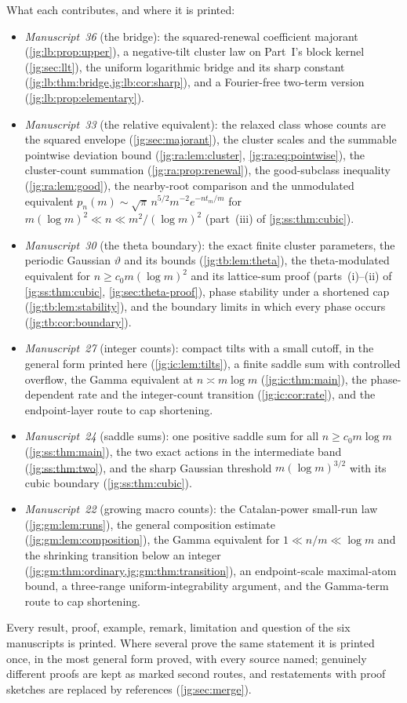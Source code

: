 \documentclass[11pt,a4paper]{article}
\theoremstyle{definition}\newaliascnt{definition}{theorem}
\theoremstyle{remark}\newaliascnt{remark}{theorem}
\begin{document}
What each contributes, and where it is printed:
\begin{itemize}
\item \emph{Manuscript~36} (the bridge): the squared-renewal coefficient
 majorant (\cref{jg:lb:prop:upper}), a negative-tilt cluster law on Part~I's
 block kernel (\cref{jg:sec:llt}), the uniform logarithmic bridge and its sharp
 constant (\cref{jg:lb:thm:bridge,jg:lb:cor:sharp}), and a Fourier-free
 two-term version (\cref{jg:lb:prop:elementary}).
\item \emph{Manuscript~33} (the relative equivalent): the relaxed class whose
 counts are the squared envelope (\cref{jg:sec:majorant}), the cluster scales
 and the summable pointwise deviation bound (\cref{jg:ra:lem:cluster},
 \eqref{jg:ra:eq:pointwise}), the cluster-count summation
 (\cref{jg:ra:prop:renewal}), the good-subclass inequality
 (\cref{jg:ra:lem:good}), the nearby-root comparison and the unmodulated
 equivalent $p_n(m)\sim\sqrt\pi\,n^{5/2}m^{-2}e^{-nt_m/m}$ for
 $m(\log m)^2\ll n\ll m^2/(\log m)^2$ (part~(iii) of \cref{jg:ss:thm:cubic}).
\item \emph{Manuscript~30} (the theta boundary): the exact finite cluster
 parameters, the periodic Gaussian $\vartheta$ and its bounds
 (\cref{jg:tb:lem:theta}), the theta-modulated equivalent for
 $n\ge c_0m(\log m)^2$ and its lattice-sum proof (parts~(i)--(ii) of
 \cref{jg:ss:thm:cubic}, \cref{jg:sec:theta-proof}), phase stability under a
 shortened cap (\cref{jg:tb:lem:stability}), and the boundary limits in which
 every phase occurs (\cref{jg:tb:cor:boundary}).
\item \emph{Manuscript~27} (integer counts): compact tilts with a small
 cutoff, in the general form printed here (\cref{jg:ic:lem:tilts}), a finite
 saddle sum with controlled overflow, the Gamma equivalent at
 $n\asymp m\log m$ (\cref{jg:ic:thm:main}), the phase-dependent rate and the
 integer-count transition (\cref{jg:ic:cor:rate}), and the endpoint-layer route
 to cap shortening.
\item \emph{Manuscript~24} (saddle sums): one positive saddle sum for all
 $n\ge c_0m\log m$ (\cref{jg:ss:thm:main}), the two exact actions in the
 intermediate band (\cref{jg:ss:thm:two}), and the sharp Gaussian threshold
 $m(\log m)^{3/2}$ with its cubic boundary (\cref{jg:ss:thm:cubic}).
\item \emph{Manuscript~22} (growing macro counts): the Catalan-power small-run
 law (\cref{jg:gm:lem:runs}), the general composition estimate
 (\cref{jg:gm:lem:composition}), the Gamma equivalent for
 $1\ll n/m\ll\log m$ and the shrinking transition below an integer
 (\cref{jg:gm:thm:ordinary,jg:gm:thm:transition}), an endpoint-scale
 maximal-atom bound, a three-range uniform-integrability argument, and the
 Gamma-term route to cap shortening.
\end{itemize}
Every result, proof, example, remark, limitation and question of the six
manuscripts is printed. Where several prove the same statement it is printed
once, in the most general form proved, with every source named; genuinely
different proofs are kept as marked second routes, and restatements with proof
sketches are replaced by references (\cref{jg:sec:merge}).
\end{document}
